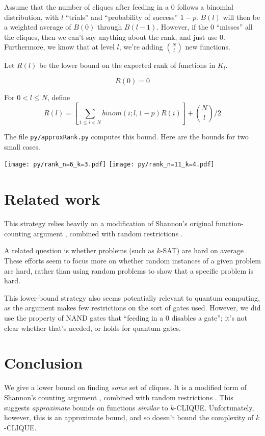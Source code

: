 \documentclass[12pt]{article}
\theoremstyle{definition}
\begin{document}
Assume that the number of cliques after feeding in a 0 follows a binomial
distribution, with $l$ ``trials'' and ``probability of success'' $1-p$.
$B(l)$ will then be a weighted average of $B(0)$ through $B(l-1)$. However,
if the 0 ``misses'' all the cliques, then we can't say anything about the
rank, and just use 0.
Furthermore, we know that at level $l$, we're adding ${N \choose l}$ new
functions.


Let $R(l)$ be the lower bound on the expected rank of functions in $K_l$.

\[
R(0) = 0
\]

For $0 < l \le N$, define
\[
	R(l) = [ \sum_{1\le i < N} binom(i; l, 1-p) R(i) ] + {N \choose l}/2
\]

The file {\tt py/approxRank.py} computes this bound. Here are the bounds
for two small cases.

\texttt{[image: py/rank\_n=6\_k=3.pdf]}
\texttt{[image: py/rank\_n=11\_k=4.pdf]}

\section{Related work}

This strategy relies heavily on a modification of Shannon's original
function-counting argument \cite{shannon_synthesis_1949},
combined with random restrictions
\cite{subbotovskaya1963comparison} \cite{hastad1987lower}.

A related question is whether problems
(such as $k$-SAT) are
hard on average \cite{bogdanov2006average}.
These efforts seem to focus more on whether
random
instances of a given problem are hard, rather
than using random problems to show that
a specific problem is hard.

This lower-bound strategy also seems potentially
relevant to quantum computing,
as the argument makes few restrictions on the sort of gates used.
However, we did use the property of NAND gates that ``feeding in
a 0 disables a gate''; it's not clear whether that's needed,
or holds for quantum gates.

\section{Conclusion}

We give a lower bound on finding {\em some} set of cliques.
It is a modified form of Shannon's counting argument
\cite{shannon_synthesis_1949}, combined with random restrictions
\cite{subbotovskaya1963comparison} \cite{hastad1987lower}.
This suggests {\em approximate} bounds on functions {\em similar} to $k$-CLIQUE.
Unfortunately, however, this is an approximate bound,
and so doesn't bound the complexity of $k$-CLIQUE.
\end{document}
